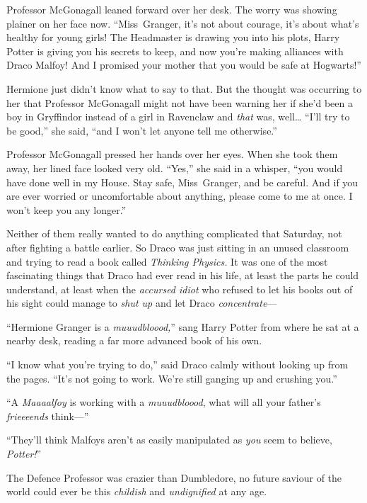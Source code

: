 Professor McGonagall leaned forward over her desk. The worry was showing plainer on her face now. “Miss~Granger, it’s not about courage, it’s about what’s healthy for young girls! The Headmaster is drawing you into his plots, Harry Potter is giving you his secrets to keep, and now you’re making alliances with Draco Malfoy! And I promised your mother that you would be safe at Hogwarts!”

Hermione just didn’t know what to say to that. But the thought was occurring to her that Professor McGonagall might not have been warning her if she’d been a boy in Gryffindor instead of a girl in Ravenclaw and \emph{that} was, well… “I’ll try to be good,” she said, “and I won’t let anyone tell me otherwise.”

Professor McGonagall pressed her hands over her eyes. When she took them away, her lined face looked very old. “Yes,” she said in a whisper, “you would have done well in my House. Stay safe, Miss~Granger, and be careful. And if you are ever worried or uncomfortable about anything, please come to me at once. I won’t keep you any longer.”


Neither of them really wanted to do anything complicated that Saturday, not after fighting a battle earlier. So Draco was just sitting in an unused classroom and trying to read a book called \emph{Thinking Physics.} It was one of the most fascinating things that Draco had ever read in his life, at least the parts he could understand, at least when the \emph{accursed idiot} who refused to let his books out of his sight could manage to \emph{shut up} and let Draco \emph{concentrate}—

“Hermione Granger is a \emph{muuudbloood,}” sang Harry Potter from where he sat at a nearby desk, reading a far more advanced book of his own.

“I know what you’re trying to do,” said Draco calmly without looking up from the pages. “It’s not going to work. We’re still ganging up and crushing you.”

“A \emph{Maaaalfoy} is working with a \emph{muuudbloood}, what will all your father’s \emph{frieeeends} think—”

“They’ll think Malfoys aren’t as easily manipulated as \emph{you} seem to believe, \emph{Potter!}”

The Defence Professor was crazier than Dumbledore, no future saviour of the world could ever be this \emph{childish} and \emph{undignified} at any age.

